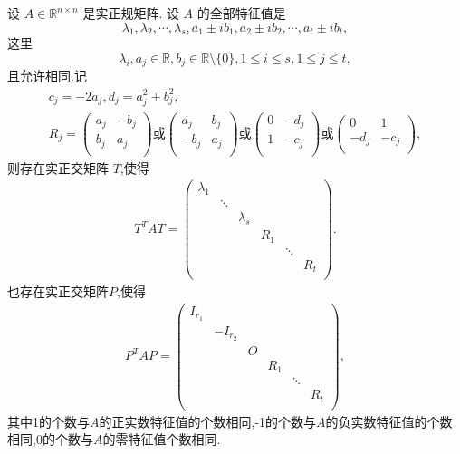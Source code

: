 \documentclass[../../main.tex]{subfiles}%
\begin{document}
\begin{theorem}[实正规矩阵的正交相似标准型]\label{theorem:实正规矩阵的正交相似标准型}
设 $A \in \mathbb{R}^{n \times n}$ 是实正规矩阵. 设 $A$ 的全部特征值是
$$\lambda_1,\lambda_2,\cdots,\lambda_s,a_1 \pm ib_1,a_2 \pm ib_2,\cdots,a_t \pm ib_t,$$
这里
$$\lambda_i,a_j \in \mathbb{R},b_j \in \mathbb{R} \setminus \{0\},1 \leqslant i \leqslant s,1 \leqslant j \leqslant t,$$
且允许相同.记
\begin{gather*}
c_j=-2a_j,d_j=a_j^2+b_j^2,
\\
R_j=\left( \begin{matrix}
a_j&		-b_j\\
b_j&		a_j\\
\end{matrix} \right) \text{或}\left( \begin{matrix}
a_j&		b_j\\
-b_j&		a_j\\
\end{matrix} \right) \text{或}\left( \begin{matrix}
0&		-d_j\\
1&		-c_j\\
\end{matrix} \right) \text{或}\left( \begin{matrix}
0&		1\\
-d_j&		-c_j\\
\end{matrix} \right) 
,
\end{gather*}
则存在实正交矩阵 $T$,使得
\begin{align}
T^TAT = 
\left( \begin{matrix}
\lambda _1&		&		&		&		&		\\
&		\ddots&		&		&		&		\\
&		&		\lambda _s&		&		&		\\
&		&		&		R_1&		&		\\
&		&		&		&		\ddots&		\\
&		&		&		&		&		R_t\\
\end{matrix} \right) .
\label{eq:23.22234820uu0358023r2312r}
\end{align}
也存在实正交矩阵$P$,使得
\begin{align*}
P^T A P= \left( \begin{matrix}
I_{r_1}&		&		&		&		&		\\
&		-I_{r_2}&		&		&		&		\\
&		&		O&		&		&		\\
&		&		&		R_1&		&		\\
&		&		&		&		\ddots&		\\
&		&		&		&		&		R_t\\
\end{matrix} \right)  ,
\end{align*}
其中1的个数与$A$的正实数特征值的个数相同,-1的个数与$A$的负实数特征值的个数相同,0的个数与$A$的零特征值个数相同.
\end{theorem}
\end{document}
